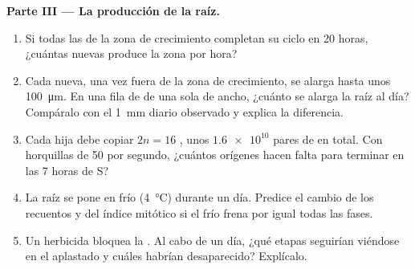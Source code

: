 \begin{problem}
\medskip
\noindent\textbf{Parte III --- La producción de la raíz.}
\begin{enumerate}[resume]
  \item Si todas las  de la zona de crecimiento completan su
        ciclo en 20 horas, ¿cuántas  nuevas produce la zona por
        hora?
  \item Cada  nueva, una vez fuera de la zona de crecimiento, se
        alarga hasta unos \qty{100}{\micro m}. En una fila de 
        de una sola  de ancho, ¿cuánto se alarga la raíz al día?
        Compáralo con el \qty{1}{mm} diario observado y explica la
        diferencia.
  \item Cada  hija debe copiar $2n = 16$ , unos
        $\num{1.6e10}$ pares de  en total. Con horquillas de 50
         por segundo, ¿cuántos orígenes hacen falta para
        terminar en las 7 horas de S?
  \item La raíz se pone en frío (\qty{4}{\celsius}) durante un día.
        Predice el cambio de los recuentos y del índice mitótico si el
        frío frena por igual todas las fases.
  \item Un herbicida bloquea la . Al cabo de un día, ¿qué
        etapas seguirían viéndose en el aplastado y cuáles habrían
        desaparecido? Explícalo.
\end{enumerate}


\end{problem}
